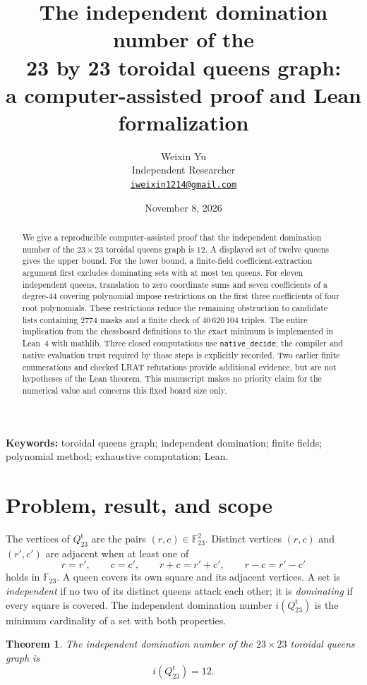 \documentclass[11pt,a4paper]{article}
\title{The independent domination number of the\texorpdfstring{\\}{ }23 by 23 toroidal queens graph:\texorpdfstring{\\}{ }a computer-assisted proof and Lean formalization}
\author{Weixin Yu\\Independent Researcher\\\href{mailto:iweixin1214@gmail.com}{\texttt{iweixin1214@gmail.com}}}
\date{November 8, 2026}
\newtheorem{theorem}{Theorem}[section]
\theoremstyle{remark}
\newcommand{\F}{\mathbb F_{23}}
\newcommand{\Qt}{Q_{23}^{\mathrm t}}
\begin{document}
\maketitle
\begin{abstract}
We give a reproducible computer-assisted proof that the independent domination
number of the $23\times23$ toroidal queens graph is $12$. A displayed set of
twelve queens gives the upper bound. For the lower bound, a finite-field
coefficient-extraction argument first excludes dominating sets with at most ten
queens. For eleven independent queens, translation to zero coordinate sums and
seven coefficients of a degree-$44$ covering polynomial impose restrictions on
the first three coefficients of four root polynomials. These restrictions reduce
the remaining obstruction to candidate lists containing $2774$ masks and a
finite check of $40\,620\,104$ triples. The entire implication from the chessboard
definitions to the exact minimum is implemented in Lean~4 with mathlib.
Three closed computations use \texttt{native\_decide}; the compiler and native
evaluation trust required by those steps is explicitly recorded. Two earlier
finite enumerations and checked LRAT refutations provide additional evidence,
but are not hypotheses of the Lean theorem. This manuscript makes no priority
claim for the numerical value and concerns this fixed board size only.
\end{abstract}

\noindent\textbf{Keywords:} toroidal queens graph; independent domination;
finite fields; polynomial method; exhaustive computation; Lean.

\section{Problem, result, and scope}
The vertices of $\Qt$ are the pairs $(r,c)\in\F^2$. Distinct vertices
$(r,c)$ and $(r',c')$ are adjacent when at least one of
\[
 r=r',\qquad c=c',\qquad r+c=r'+c',\qquad r-c=r'-c'
\]
holds in $\F$. A queen covers its own square and its adjacent vertices.
A set is \emph{independent} if no two of its distinct queens attack each other;
it is \emph{dominating} if every square is covered. The independent domination
number $i(\Qt)$ is the minimum cardinality of a set with both properties.

\begin{theorem}\label{thm:main}
The independent domination number of the $23\times23$ toroidal queens graph is
\[
 i(\Qt)=12.
\]
\end{theorem}
\end{document}
